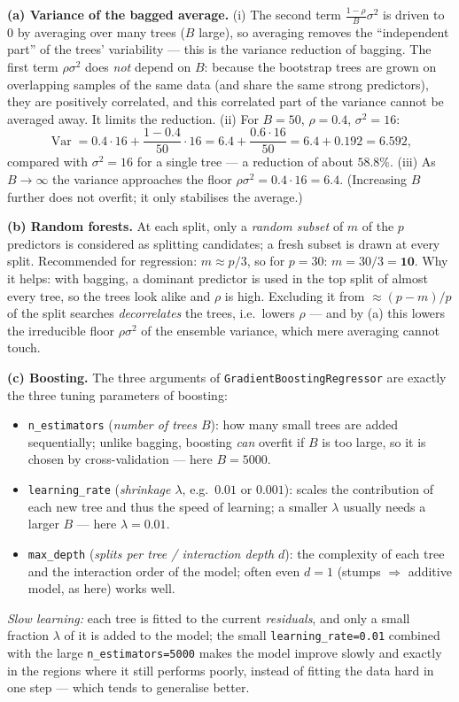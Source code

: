 \documentclass[11pt,a4paper]{article}
\begin{document}
\ifdefined\withsolutions
\begin{solutionbox}
\textbf{(a) Variance of the bagged average.}
(i) The second term $\frac{1-\rho}{B}\sigma^2$ is driven to $0$ by averaging over many trees
($B$ large), so averaging removes the ``independent part'' of the trees' variability ---
this is the variance reduction of bagging. The first term $\rho\sigma^2$ does \emph{not}
depend on $B$: because the bootstrap trees are grown on overlapping samples of the same data
(and share the same strong predictors), they are positively correlated, and this correlated
part of the variance cannot be averaged away. It limits the reduction.
(ii) For $B=50$, $\rho=0.4$, $\sigma^2=16$:
\[
  \operatorname{Var}=0.4\cdot 16+\frac{1-0.4}{50}\cdot 16
  =6.4+\frac{0.6\cdot 16}{50}=6.4+0.192=\mathbf{6.592},
\]
compared with $\sigma^2=16$ for a single tree --- a reduction of about $58.8\%$.
(iii) As $B\to\infty$ the variance approaches the floor $\rho\sigma^2=0.4\cdot 16=\mathbf{6.4}$.
(Increasing $B$ further does not overfit; it only stabilises the average.)

\medskip
\textbf{(b) Random forests.}
At each split, only a \emph{random subset} of $m$ of the $p$ predictors is considered as
splitting candidates; a fresh subset is drawn at every split. Recommended for regression:
$m\approx p/3$, so for $p=30$: $m=30/3=\mathbf{10}$.
Why it helps: with bagging, a dominant predictor is used in the top split of almost every tree,
so the trees look alike and $\rho$ is high. Excluding it from $\approx (p-m)/p$ of the split
searches \emph{decorrelates} the trees, i.e.\ lowers $\rho$ --- and by (a) this lowers the
irreducible floor $\rho\sigma^2$ of the ensemble variance, which mere averaging cannot touch.

\medskip
\textbf{(c) Boosting.}
The three arguments of \texttt{GradientBoostingRegressor} are exactly the three tuning
parameters of boosting:
\begin{itemize}[nosep,leftmargin=5mm]
  \item \texttt{n\_estimators} (\emph{number of trees $B$}): how many small trees are added
    sequentially; unlike bagging, boosting \emph{can} overfit if $B$ is too large, so it is
    chosen by cross-validation --- here $B=5000$.
  \item \texttt{learning\_rate} (\emph{shrinkage $\lambda$}, e.g.\ $0.01$ or $0.001$): scales
    the contribution of each new tree and thus the speed of learning; a smaller $\lambda$
    usually needs a larger $B$ --- here $\lambda=0.01$.
  \item \texttt{max\_depth} (\emph{splits per tree / interaction depth $d$}): the complexity of
    each tree and the interaction order of the model; often even $d=1$ (stumps $\Rightarrow$
    additive model, as here) works well.
\end{itemize}
\emph{Slow learning:} each tree is fitted to the current \emph{residuals}, and only a small
fraction $\lambda$ of it is added to the model; the small \texttt{learning\_rate=0.01} combined
with the large \texttt{n\_estimators=5000} makes the model improve slowly and exactly in the
regions where it still performs poorly, instead of fitting the data hard in one step --- which
tends to generalise better.


\end{solutionbox}
\end{document}
